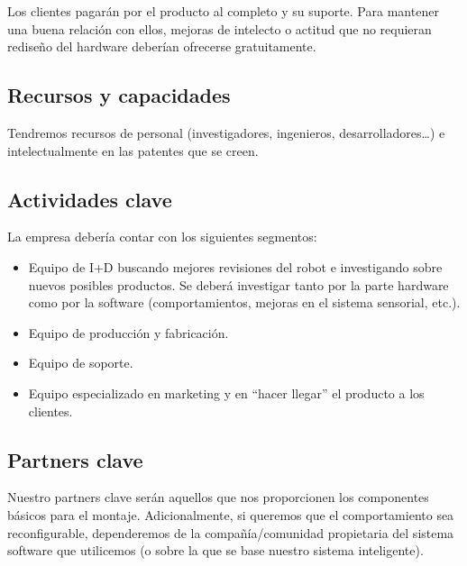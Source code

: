 Los clientes pagarán por el producto al completo y su suporte. Para mantener una buena relación con ellos, mejoras de intelecto o actitud que no requieran rediseño del hardware deberían ofrecerse gratuitamente.

\subsection{Recursos y capacidades}


Tendremos recursos de personal (investigadores, ingenieros, desarrolladores\dots) e intelectualmente en las patentes que se creen.

\subsection{Actividades clave}


La empresa debería contar con los siguientes segmentos:
\begin{itemize}
    \item Equipo de I+D buscando mejores revisiones del robot e investigando sobre nuevos posibles productos. Se deberá investigar tanto por la parte hardware como por la software (comportamientos, mejoras en el sistema sensorial, etc.).
    \item Equipo de producción y fabricación.
    \item Equipo de soporte.
    \item Equipo especializado en marketing y en ``hacer llegar'' el producto a los clientes.
\end{itemize}

\subsection{Partners clave}

Nuestro partners clave serán aquellos que nos proporcionen los componentes básicos para el montaje. Adicionalmente, si queremos que el comportamiento sea reconfigurable, dependeremos de la compañía/comunidad propietaria del sistema software que utilicemos (o sobre la que se base nuestro sistema inteligente).

